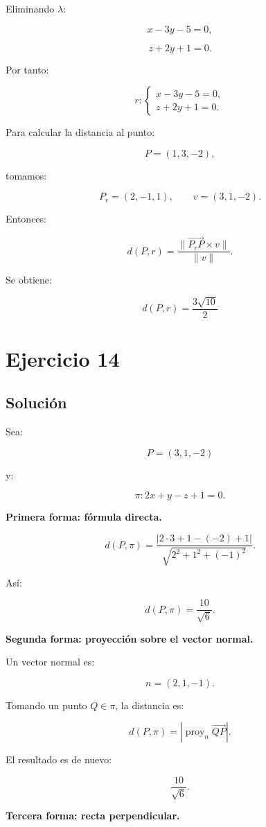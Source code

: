 \documentclass[11pt,a4paper]{article}
\begin{document}
Eliminando \(\lambda\):

\[
x-3y-5=0,
\]

\[
z+2y+1=0.
\]

Por tanto:

\[
\boxed{
r:
\begin{cases}
x-3y-5=0,\\
z+2y+1=0.
\end{cases}
}
\]

Para calcular la distancia al punto:

\[
P=(1,3,-2),
\]

tomamos:

\[
P_r=(2,-1,1),
\qquad
v=(3,1,-2).
\]

Entonces:

\[
d(P,r)
=
\frac{
\|\overrightarrow{P_rP}\times v\|
}{
\|v\|
}.
\]

Se obtiene:

\[
\boxed{
d(P,r)
=
\frac{3\sqrt{10}}{2}
}
\]

\section{Ejercicio 14}
\subsection{Solución}

Sea:

\[
P=(3,1,-2)
\]

y:

\[
\pi:
2x+y-z+1=0.
\]

\textbf{Primera forma: fórmula directa.}

\[
d(P,\pi)
=
\frac{
|2\cdot3+1-(-2)+1|
}{
\sqrt{2^2+1^2+(-1)^2}
}.
\]

Así:

\[
d(P,\pi)
=
\frac{10}{\sqrt6}.
\]

\textbf{Segunda forma: proyección sobre el vector normal.}

Un vector normal es:

\[
n=(2,1,-1).
\]

Tomando un punto \(Q\in\pi\), la distancia es:

\[
d(P,\pi)
=
\left|
\operatorname{proy}_{n}
\overrightarrow{QP}
\right|.
\]

El resultado es de nuevo:

\[
\frac{10}{\sqrt6}.
\]

\textbf{Tercera forma: recta perpendicular.}
\end{document}
